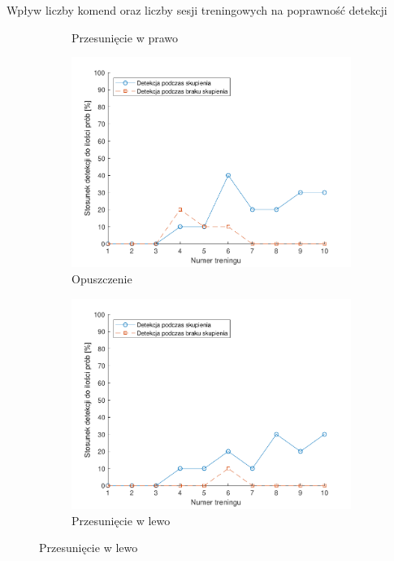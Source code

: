 \documentclass[10pt,aspectratio=169]{beamer}
\begin{document}
\begin{frame}{Wpływ liczby komend oraz liczby sesji treningowych na poprawność detekcji}
\begin{figure}[htb]
\begin{subfigure}{0.3\linewidth}
    \caption{Przesunięcie w prawo}
    \end{subfigure}\hspace*{\fill}
    \begin{subfigure}{0.3\linewidth}
    \includegraphics[width=\linewidth,keepaspectratio]{obrazy/down}
    \caption{Opuszczenie}
    \end{subfigure}
    \medskip
    \hspace*{\fill}
    \begin{subfigure}{0.3\linewidth}
    \includegraphics[width=\linewidth,keepaspectratio]{obrazy/left}
    \caption{Przesunięcie w lewo}
    \end{subfigure}\hspace*{\fill}

\end{figure}
\end{frame}
\end{document}
